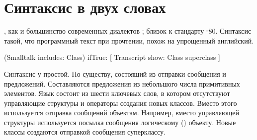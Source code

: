 \documentclass[a4paper,10pt,twoside]{book}
\begin{document}
	\renewcommand{\nnbb}[2]{} %
	\sloppy
\fi
\chapter{Синтаксис в двух словах}



\pharo, как и большинство современных диалектов \st, близок к стандарту \st-80. Синтаксис такой,
что программный текст при прочтении, похож на упрощенный английский.

\begin{code}{}
(Smalltalk includes: Class) ifTrue: [ Transcript show: Class superclass ]
\end{code}

\noindent
Синтаксис у \pharo простой. По существу, состоящий из отправки сообщения и предложений.
Составляются предложения из небольшого числа примитивных элементов.
Язык состоит из шести ключевых слов, в котором отсутствуют управляющие структуры и операторы создания новых классов.
Вместо этого используется отправка сообщений объектам.
Например, вместо управляющей структуры  используется посылка сообщения  логическому () объекту.
Новые классы создаются отправкой сообщения суперклассу.
\end{document}
